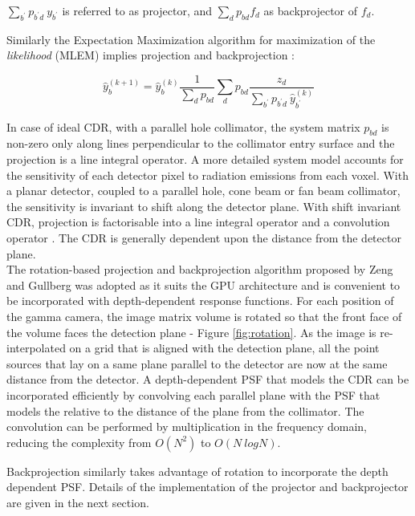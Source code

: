 \documentclass[12pt,a4paper]{report}
\begin{document}
\noindent $\sum_{b^{\prime}}p_{b^{\prime}d}\ y_{b^{\prime}}$ is referred to as projector, and $\sum_{d}{p_{bd}f_d}$ as backprojector of $f_d$.

\noindent Similarly the Expectation Maximization algorithm for maximization of the \textit{likelihood} (MLEM) 
implies projection and backprojection \cite{shepp_1982}:

\begin{equation}
 \label{eq:mlem}
 \hat{y}_b^{(k+1)} = \hat{y}_b^{(k)} \frac{1}{\sum_{d}{p_{bd}}} \sum_{d}{p_{bd}\frac{z_d}{\sum_{b^{\prime}}p_{b^{\prime}d}\ \hat{y}^{(k)}_{b^{\prime}}}}
\end{equation}

\noindent In case of ideal CDR, with a parallel hole collimator, the system matrix $p_{bd}$ is non-zero only along 
lines perpendicular to the collimator entry surface and the 
projection is a line integral operator. A more detailed system model accounts for the sensitivity 
of each detector pixel to radiation emissions from each voxel. With a planar detector, coupled to a parallel hole, cone beam or fan beam collimator, 
the sensitivity is invariant to shift along the detector plane. With shift invariant CDR, 
projection is factorisable into a line integral operator and a convolution operator \cite{zeng_1992}. 
The CDR is generally dependent upon the distance from the detector plane. \\

The rotation-based projection and backprojection algorithm proposed by Zeng and Gullberg \cite{zeng_1992} was adopted
as it suits the GPU architecture and is convenient to be incorporated with depth-dependent response functions. 
For each position of the gamma camera, the image matrix volume is rotated so that the front face of the volume faces the 
detection plane - Figure \ref{fig:rotation}. As the image is re-interpolated on a grid that is aligned with the detection plane, all the point sources that lay on a same 
plane parallel to the detector are now at the same distance from the detector. A depth-dependent PSF that models the 
CDR can be incorporated efficiently by convolving each parallel plane with the PSF that models the 
relative to the distance of the plane from the collimator. 
The convolution can be performed by multiplication in the frequency domain, reducing the complexity from $O(N^2)$ to $O(N \ logN)$. 

\noindent Backprojection similarly takes advantage of rotation to incorporate the depth dependent PSF. Details of the implementation of the projector 
and backprojector are given in the next section.
\end{document}
